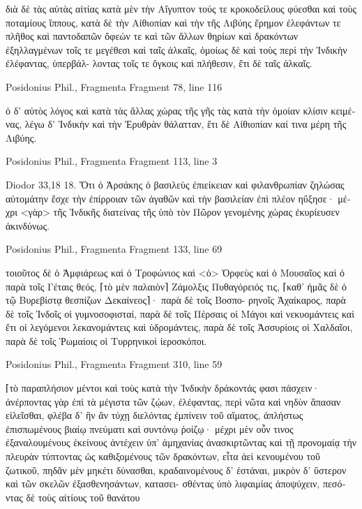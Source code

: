 \documentclass[12pt,letterpaper,twoside,final]{memoir}
\begin{document}
\begin{greek}
                 διὰ δὲ τὰς αὐτὰς αἰτίας κατὰ μὲν τὴν Αἴγυπτον τούς τε 
κροκοδείλους φύεσθαι καὶ τοὺς ποταμίους ἵππους, κατὰ δὲ τὴν Αἰθιοπίαν 
καὶ τὴν τῆς Λιβύης ἔρημον ἐλεφάντων τε πλῆθος καὶ παντοδαπῶν ὄφεών 
τε καὶ τῶν ἄλλων θηρίων καὶ δρακόντων ἐξηλλαγμένων τοῖς τε μεγέθεσι   
καὶ ταῖς ἀλκαῖς, ὁμοίως δὲ καὶ τοὺς περὶ τὴν Ἰνδικὴν ἐλέφαντας, ὑπερβάλ-
λοντας τοῖς τε ὄγκοις καὶ πλήθεσιν, ἔτι δὲ ταῖς ἀλκαῖς. 



Posidonius Phil., Fragmenta 
Fragment 78, line 116

                       ὁ δ' αὐτὸς λόγος καὶ κατὰ τὰς ἄλλας χώρας τῆς γῆς 
τὰς κατὰ τὴν ὁμοίαν κλίσιν κειμένας, λέγω δ' Ἰνδικὴν καὶ τὴν Ἐρυθρὰν 
θάλατταν, ἔτι δὲ Αἰθιοπίαν καί τινα μέρη τῆς Λιβύης. 



Posidonius Phil., Fragmenta 
Fragment 113, line 3

Diodor 33,18 
18. Ὅτι ὁ Ἀρσάκης ὁ βασιλεὺς ἐπιείκειαν καὶ φιλανθρωπίαν ζηλώσας 
αὐτομάτην ἔσχε τὴν ἐπίρροιαν τῶν ἀγαθῶν καὶ τὴν βασιλείαν ἐπὶ πλέον 
ηὔξησε· μέχρι <γὰρ> τῆς Ἰνδικῆς διατείνας τῆς ὑπὸ τὸν Πῶρον γενομένης 
χώρας ἐκυρίευσεν ἀκινδύνως. 



Posidonius Phil., Fragmenta 
Fragment 133, line 69

τοιοῦτος δὲ ὁ Ἀμφιάρεως καὶ ὁ Τροφώνιος καὶ <ὁ> Ὀρφεὺς καὶ ὁ Μουσαῖος 
καὶ ὁ παρὰ τοῖς Γέταις θεός, ⌈τὸ μὲν παλαιὸν⌉ Ζάμολξις Πυθαγόρειός τις, 
⌈καθ' ἡμᾶς δὲ ὁ τῷ Βυρεβίστᾳ θεσπίζων Δεκαίνεος⌉· παρὰ δὲ τοῖς Βοσπο-
ρηνοῖς Ἀχαίκαρος, παρὰ δὲ τοῖς Ἰνδοῖς οἱ γυμνοσοφισταί, παρὰ δὲ τοῖς 
Πέρσαις οἱ Μάγοι καὶ νεκυομάντεις καὶ ἔτι οἱ λεγόμενοι λεκανομάντεις 
καὶ ὑδρομάντεις, παρὰ δὲ τοῖς Ἀσσυρίοις οἱ Χαλδαῖοι, παρὰ δὲ τοῖς 
Ῥωμαίοις οἱ Τυρρηνικοὶ ἱεροσκόποι. 



Posidonius Phil., Fragmenta 
Fragment 310, line 59

                                                             ⌈τὸ παραπλήσιον 
μέντοι καὶ τοὺς κατὰ τὴν Ἰνδικὴν δράκοντάς φασι πάσχειν· ἀνέρποντας 
γὰρ ἐπὶ τὰ μέγιστα τῶν ζῴων, ἐλέφαντας, περὶ νῶτα καὶ νηδὺν ἅπασαν 
εἱλεῖσθαι, φλέβα δ' ἣν ἂν τύχῃ διελόντας ἐμπίνειν τοῦ αἵματος, ἀπλήστως 
ἐπισπωμένους βιαίῳ πνεύματι καὶ συντόνῳ ῥοίζῳ· μέχρι μὲν οὖν τινος   
ἐξαναλουμένους ἐκείνους ἀντέχειν ὑπ' ἀμηχανίας ἀνασκιρτῶντας καὶ τῇ 
προνομαίᾳ τὴν πλευρὰν τύπτοντας ὡς καθιξομένους τῶν δρακόντων, εἶτα 
ἀεὶ κενουμένου τοῦ ζωτικοῦ, πηδᾶν μὲν μηκέτι δύνασθαι, κραδαινομένους 
δ' ἑστάναι, μικρὸν δ' ὕστερον καὶ τῶν σκελῶν ἐξασθενησάντων, κατασει-
σθέντας ὑπὸ λιφαιμίας ἀποψύχειν, πεσόντας δὲ τοὺς αἰτίους τοῦ θανάτου 





\end{greek}
\end{document}
